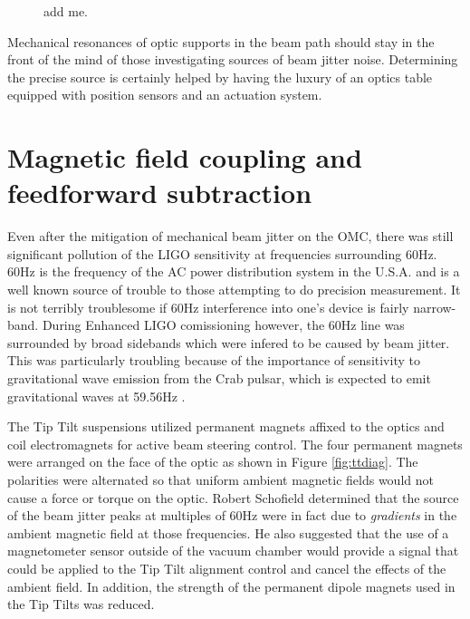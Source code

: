 \begin{figure}
  \begin{center}
  \leavevmode
  \end{center}
  \caption[add me]{add me.}
  \label{fig:sensimprovement}
\end{figure}

Mechanical resonances of optic supports in the beam path should stay in the front of the mind of those investigating sources of beam jitter noise. %
Determining the precise source is certainly helped by having the luxury of an optics table equipped with position sensors and an actuation system.
\section{Magnetic field coupling and feedforward subtraction}
Even after the mitigation of mechanical beam jitter on the OMC, there was still significant pollution of the LIGO sensitivity at frequencies surrounding 60Hz. %
60Hz is the frequency of the AC power distribution system in the U.S.A. %
and is a well known source of trouble to those attempting to do precision measurement. %
It is not terribly troublesome if 60Hz interference into one's device is fairly narrow-band. %
During Enhanced LIGO comissioning however, the 60Hz line was surrounded by broad sidebands which were infered to be caused by beam jitter. %
This was particularly troubling because of the importance of sensitivity to gravitational wave emission from the Crab pulsar, which is expected to emit gravitational waves at 59.56Hz \cite{Crab}.

The Tip Tilt suspensions utilized permanent magnets affixed to the optics and coil electromagnets for active beam steering control. %
The four permanent magnets were arranged on the face of the optic as shown in Figure \ref{fig:ttdiag}. %
The polarities were alternated so that uniform ambient magnetic fields would not cause a force or torque on the optic. %
Robert Schofield determined that the source of the beam jitter peaks at multiples of 60Hz were in fact due to \emph{gradients} in the ambient magnetic field at those frequencies. %
He also suggested that the use of a magnetometer sensor outside of the vacuum chamber would provide a signal that could be applied to the Tip Tilt alignment control and cancel the effects of the ambient field. In addition, the strength of the permanent dipole magnets used in the Tip Tilts was reduced.

